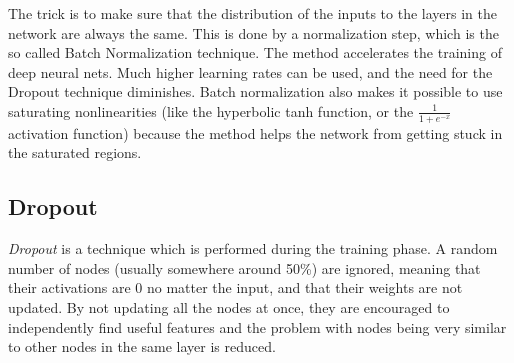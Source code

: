 The trick is to make sure that the distribution of the inputs to the layers in the network are always the same. This is done by a normalization step, which is the so called Batch Normalization technique. The method accelerates the training of deep neural nets. Much higher learning rates can be used, and the need for the Dropout technique diminishes. Batch normalization also makes it possible to use saturating nonlinearities (like the hyperbolic tanh function, or the $\frac{1}{1 + e^{-x}}$ activation function) because the method helps the network from getting stuck in the saturated regions. 

\subsection{Dropout}
\emph{Dropout} \citep{Dropout} is a technique which is performed during the training phase. A random number of nodes (usually somewhere around 50\%) are ignored, meaning that their activations are 0 no matter the input, and that their weights are not updated. By not updating all the nodes at once, they are encouraged to independently find useful features and the problem with nodes being very similar to other nodes in the same layer is reduced. 







